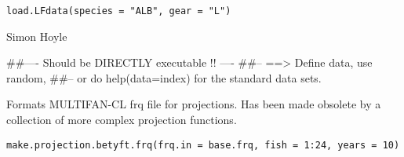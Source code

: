 \documentclass[a4paper]{book}
\begin{document}
%
\begin{Usage}
\begin{verbatim}
load.LFdata(species = "ALB", gear = "L")
\end{verbatim}
\end{Usage}
%
\begin{Arguments}
\begin{ldescription}
\item[\code{species}] 


\item[\code{gear}] 


\end{ldescription}
\end{Arguments}
%
\begin{Author}\relax

Simon Hoyle
\end{Author}
%
\begin{Examples}
\begin{ExampleCode}
##---- Should be DIRECTLY executable !! ----
##-- ==>  Define data, use random,
##--	or do  help(data=index)  for the standard data sets.

\end{ExampleCode}
\end{Examples}
%
\begin{Description}\relax

Formats MULTIFAN-CL frq file for projections. Has been made obsolete by a collection of more complex projection functions. 
\end{Description}
%
\begin{Usage}
\begin{verbatim}
make.projection.betyft.frq(frq.in = base.frq, fish = 1:24, years = 10)
\end{verbatim}
\end{Usage}
%
\begin{Arguments}
\begin{ldescription}
\item[\code{frq.in}] 


\item[\code{fish}] 


\item[\code{years}] 


\end{ldescription}
\end{Arguments}
\end{document}
